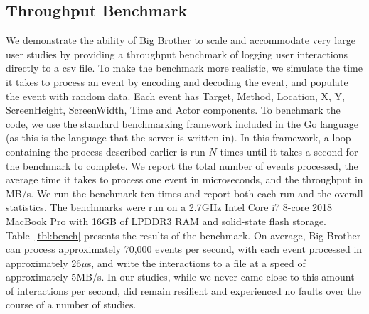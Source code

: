 \vspace{-8pt}
\subsection{Throughput Benchmark}

We demonstrate the ability of Big Brother to scale and accommodate very large user studies by providing a throughput benchmark of logging user interactions directly to a csv file. To make the benchmark more realistic, we simulate the time it takes to process an event by encoding and decoding the event, and populate the event with random data. Each event has Target, Method, Location, X, Y, ScreenHeight, ScreenWidth, Time and Actor components. To benchmark the code, we use the standard benchmarking framework included in the Go language (as this is the language that the server is written in). In this framework, a loop containing the process described earlier is run $N$ times until it takes a second for the benchmark to complete. We report the total number of events processed, the average time it takes to process one event in microseconds, and the throughput in MB/s. We run the benchmark ten times and report both each run and the overall statistics. The benchmarks were run on a 2.7GHz Intel Core i7 8-core 2018 MacBook Pro with 16GB of LPDDR3 RAM and solid-state flash storage. Table~\ref{tbl:bench} presents the results of the benchmark. On average, Big Brother can process approximately 70,000 events per second, with each event processed in approximately 26$\mu$s, and write the interactions to a file at a speed of approximately 5MB/s. In our studies, while we never came close to this amount of interactions per second, \bb did remain resilient and experienced no faults over the course of a number of studies.


